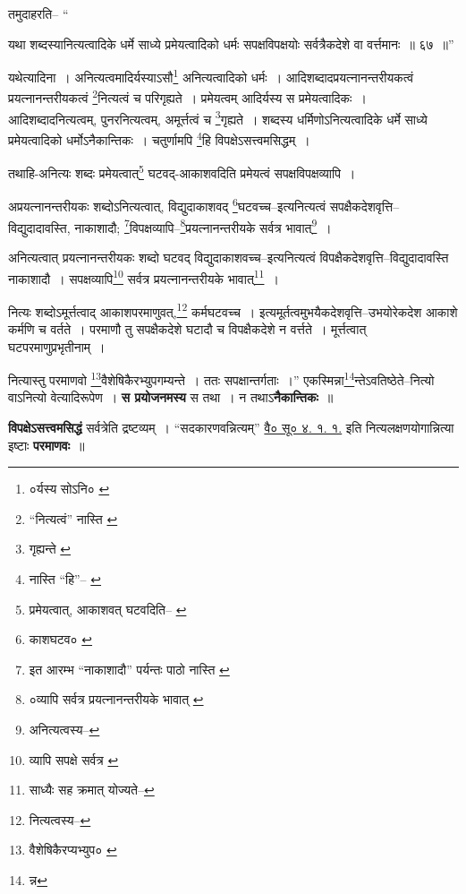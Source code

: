 \documentclass[article,12pt,a4paper]{memoir}
\begin{document}
	तमुदाहरति-- “
	  
	यथा शब्दस्यानित्यत्वादिके धर्मे साध्ये प्रमेयत्वादिको धर्मः सपक्षविपक्षयोः सर्वत्रैकदेशे वा वर्त्तमानः ॥ ६७ ॥” 
	  
	यथेत्यादिना । अनित्यत्वमादिर्यस्याऽसौ\footnote{०र्यस्य सोऽनि० \cite{dp-msA} \cite{dp-msB} \cite{dp-msD} \cite{dp-edP} \cite{dp-edH} \cite{dp-edE} \cite{dp-edN}} अनित्यत्वादिको धर्मः । आदिशब्दादप्रयत्नानन्तरीयकत्वं प्रयत्नानन्तरीयकत्वं \footnote{“नित्यत्वं” नास्ति \cite{dp-msB}}\-नित्यत्वं च परिगृह्यते । प्रमेयत्वम् आदिर्यस्य स प्रमेयत्वादिकः । आदिशब्दादनित्यत्वम्, पुनरनित्यत्वम्, अमूर्त्तत्वं च \footnote{गृह्यन्ते \cite{dp-msB}}\-गृह्यते । शब्दस्य धर्मिणोऽनित्यत्वादिके धर्मे साध्ये प्रमेयत्वादिको धर्मोऽनैकान्तिकः । चतुर्णामपि \footnote{नास्ति “हि”--\cite{dp-msA} \cite{dp-msB} \cite{dp-edP} \cite{dp-edH} \cite{dp-edN}}\-हि विपक्षेऽसत्त्वमसिद्धम् । 
	  
	तथाहि-अनित्यः शब्दः प्रमेयत्वात्\footnote{प्रमेयत्वात्, आकाशवत् घटवदिति--\cite{dp-msA} \cite{dp-msB} \cite{dp-msD} \cite{dp-edP} \cite{dp-edH} \cite{dp-edE} \cite{dp-edN}} घटवद्-आकाशवदिति प्रमेयत्वं सपक्षविपक्षव्यापि । 
	  
	अप्रयत्नानन्तरीयकः शब्दोऽनित्यत्वात्, विद्युदाकाशवद् \footnote{काशघटव० \cite{dp-msA}}\-घटवच्च--इत्यनित्यत्वं सपक्षैकदेशवृत्ति--विद्युदादावस्ति, नाकाशादौ; \footnote{इत आरम्भ “नाकाशादौ” पर्यन्तः पाठो नास्ति \cite{dp-msB}}\-विपक्षव्यापि--\footnote{०व्यापि सर्वत्र प्रयत्नानन्तरीयके भावात् \cite{dp-msC}}\-प्रयत्नानन्तरीयके सर्वत्र भावात्\footnote{अनित्यत्वस्य--\cite{dp-msD-n}} । 
	  
	अनित्यत्वात् प्रयत्नानन्तरीयकः शब्दो घटवद् विद्युदाकाशवच्च--इत्यनित्यत्वं विपक्षैकदेशवृत्ति--विद्युदादावस्ति नाकाशादौ । सपक्षव्यापि\footnote{व्यापि सपक्षे सर्वत्र \cite{dp-msC} \cite{dp-msD}} सर्वत्र प्रयत्नानन्तरीयके भावात्\footnote{साध्यैः सह क्रमात् योज्यते--\cite{dp-msD-n}} । 
	  
	नित्यः शब्दोऽमूर्त्तत्वाद् आकाशपरमाणुवत्,\footnote{नित्यत्वस्य--\cite{dp-msD-n}} कर्मघटवच्च । इत्यमूर्तत्वमुभयैकदेशवृत्ति--उभयोरेकदेश आकाशे कर्मणि च वर्तते । परमाणौ तु सपक्षैकदेशे घटादौ च विपक्षैकदेशे न वर्त्तते । मूर्त्तत्वात् घटपरमाणुप्रभृतीनाम् । 
	  
	नित्यास्तु परमाणवो \footnote{वैशेषिकैरप्यभ्युप० \cite{dp-msC}}\-वैशेषिकैरभ्युपगम्यन्ते । ततः सपक्षान्तर्गताः ।” एकस्मिन्ना\footnote{न्न}\-न्तेऽवतिष्ठेते--नित्यो वाऽनित्यो वेत्यादिरूपेण । \textbf{स प्रयोजनमस्य} स तथा । न तथाऽ\textbf{नैकान्तिकः} ॥
	\pend
      

	  \pstart \textbf{विपक्षेऽसत्त्वमसिद्धं} सर्वत्रेति द्रष्टव्यम् । \leavevmode{} “सदकारणवन्नित्यम्” \href{http://http://sarit.indology.info/?cref=vsū.4.1.1}{वै० सू० ४.
	    १. १.} इति नित्यलक्षणयोगान्नित्या इष्टाः \textbf{परमाणवः} ॥
	\pend
	  \bigskip
	  \begingroup
	
\end{document}
